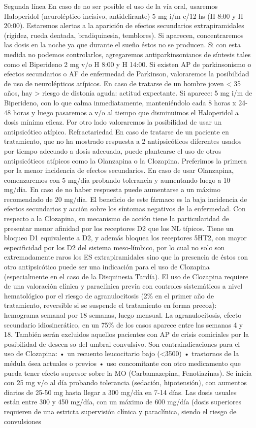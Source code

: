 \documentclass[encares.tex]{subfiles}
\begin{document}
Segunda línea En caso de no ser posible el uso de la vía oral, usaremos Haloperidol (neuroléptico incisivo, antidelirante) 5 mg i/m c/12 hs (H 8:00 y H 20:00). Estaremos alertas a la aparición de efectos secundarios extrapiramidales (rigidez, rueda dentada, bradiquinesia, temblores). Si aparecen, concentraremos las dosis en la noche ya que durante el sueño éstos no se producen. Si con esta medida no podemos controlarlos, agregaremos antiparkinsonianos de síntesis tales como el Biperideno 2 mg v/o H 8:00 y H 14:00. Si existen AP de parkinsonismo o efectos secundarios o AF de enfermedad de Parkinson, valoraremos la posibilidad de uso de neurolépticos atípicos. En caso de tratarse de un hombre joven < 35 años, hay > riesgo de distonía aguda: actitud expectante. Si aparece: 5 mg i/m de Biperideno, con lo que calma inmediatamente, manteniéndolo cada 8 horas x 24-48 horas y luego pasaremos a v/o al tiempo que disminuimos el Haloperidol a dosis mínima eficaz. Por otro lado valoraremos la posibilidad de usar un antipsicótico atípico. Refractariedad En caso de tratarse de un paciente en tratamiento, que no ha mostrado respuesta a 2 antipsicóticos diferentes usados por tiempo adecuado a dosis adecuada, puede plantearse el uso de otros antipsicóticos atípicos como la Olanzapina o la Clozapina. Preferimos la primera por la menor incidencia de efectos secundarios. En caso de usar Olanzapina, comenzaremos con 5 mg/día probando tolerancia y aumentando luego a 10 mg/día. En caso de no haber respuesta puede aumentarse a un máximo recomendado de 20 mg/día. El beneficio de este fármaco es la baja incidencia de efectos secundarios y acción sobre los síntomas negativos de la enfermedad. Con respecto a la Clozapina, su mecanismo de acción tiene la particularidad de presentar menor afinidad por los receptores D2 que los NL típicos. Tiene un bloqueo D1 equivalente a D2, y además bloquea los receptores 5HT2, con mayor especificidad por los D2 del sistema meso-límbico, por lo cual no solo son extremadamente raros los ES extrapiramidales sino que la presencia de éstos con otro antipsicótico puede ser una indicación para el uso de Clozapina (especialmente en el caso de la Disquinesia Tardía). El uso de Clozapina requiere de una valoración clínica y paraclínica previa con controles sistemáticos a nivel hematológico por el riesgo de agranulocitosis (2\% en el primer año de tratamiento, reversible si se suspende el tratamiento en forma precoz): hemograma semanal por 18 semanas, luego mensual. La agranulocitosis, efecto secundario idiosincrático, en un 75\% de los casos aparece entre las semanas 4 y 18. También serán excluidos aquellos pacientes con AP de crisis comiciales por la posibilidad de descen so del umbral convulsivo. Son contraindicaciones para el uso de Clozapina: • un recuento leucocitario bajo (<3500) • trastornos de la médula ósea actuales o previos • uso concomitante con otro medicamento que pueda tener efecto supresor sobre la MO (Carbamazepina, Fenotiazinas). Se inicia con 25 mg v/o al día probando tolerancia (sedación, hipotensión), con aumentos diarios de 25-50 mg hasta llegar a 300 mg/día en 7-14 días. Las dosis usuales están entre 300 y 450 mg/día, con un máximo de 600 mg/día (dosis superiores requieren de una estricta supervisión clínica y paraclínica, siendo el riesgo de convulsiones 
\end{document}
